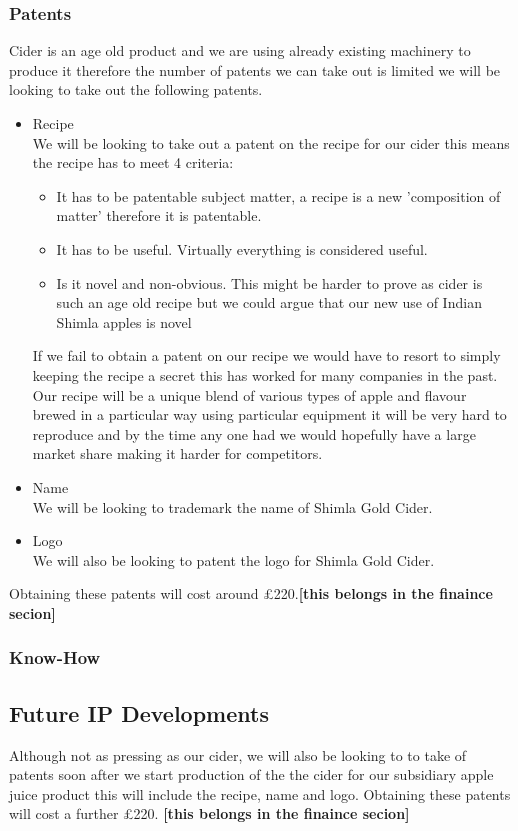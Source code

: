 \documentclass[11pt]{article}
\begin{document}
    \subsubsection{Patents}
    Cider is an age old product and we are using already existing machinery to
    produce it therefore the number of patents we can take out is limited we will
    be looking to take out the following patents.
    \begin{itemize}
    	\item Recipe \\
We will be looking to take out a patent on the recipe for our cider this means the recipe has to meet 4 criteria:
 	      \begin{itemize}
		    \item It has to be patentable subject matter, a recipe is a new 'composition of matter' therefore it is patentable.
		    \item It has to be useful. Virtually everything is considered useful.
		    \item Is it novel and non-obvious. This might be harder to prove as cider is such an age old recipe but we could argue that our new use of Indian Shimla apples is novel
	      \end{itemize}
If we fail to obtain a patent on our recipe we would have to resort to simply keeping the recipe a secret this has worked for many companies in the past. Our recipe will be a unique blend of various types of apple and flavour brewed in a particular way using particular equipment it will be very hard to reproduce and by the time any one had we would hopefully have a large market share making it harder for competitors.
	\item Name \\
    We will be looking to trademark the name of Shimla Gold Cider.
	\item Logo \\
    We will also be looking to patent the logo for Shimla Gold Cider.
    \end{itemize}
Obtaining these patents will cost around £220.\textbf{[this belongs in the finaince secion]}

    \subsubsection{Know-How}

  \subsection{Future IP Developments}
Although not as pressing as our cider, we will also be looking to to take of patents soon after we start production of the the cider for our subsidiary apple juice product this will include the recipe, name and logo. Obtaining these patents will cost a further £220. \textbf{[this belongs in the finaince secion]}
\end{document}
